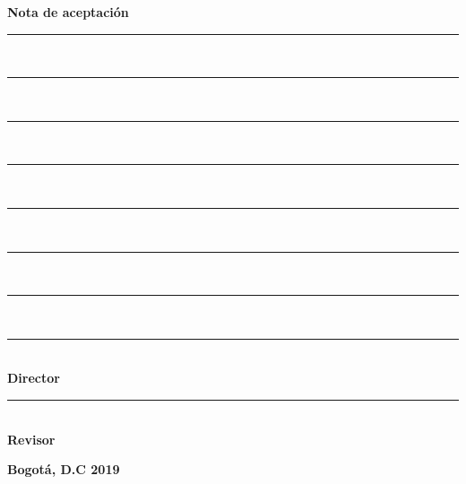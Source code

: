 \begin{flushright}
	\textbf{Nota de aceptación}\\
	\vspace{1cm}
	
	\rule{5cm}{0.1mm}\\
	\rule{5cm}{0.1mm}\\
	\rule{5cm}{0.1mm}\\
	\rule{5cm}{0.1mm}\\
	\rule{5cm}{0.1mm}\\
	\rule{5cm}{0.1mm}\\
	\rule{5cm}{0.1mm}\\
	\vspace{6.5cm}
	
	\rule{5cm}{0.1mm}\\
	\textbf{Director}\\
	\vspace{2.5cm}
	
	\rule{5cm}{0.1mm}\\
	\textbf{Revisor}\\
	\vspace{2.5cm}
	
	\flushleft \textbf{ Bogotá, D.C 2019}
	
\end{flushright}